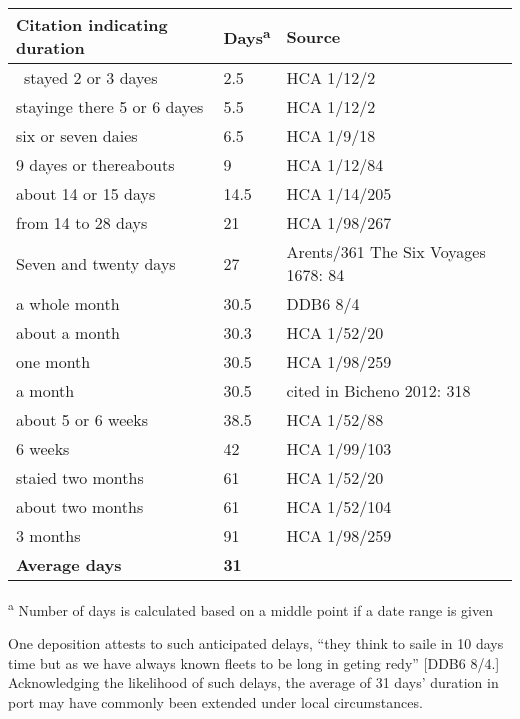 \begin{flushleft}
\tablefirsthead{}
\tablehead{}
\tabletail{}
\tablelasttail{}
\begin{supertabular}{m{2.2129598in}m{0.7747598in}m{2.7754598in}}
\hline
\textbf{Citation indicating duration} &
\textbf{Days}\textsuperscript{a} &
\textbf{Source}\\\hline
\ stayed 2 or 3 dayes  &
2.5 &
HCA 1/12/2\\
stayinge there 5 or 6 dayes &
5.5 &
HCA 1/12/2\\
six or seven daies &
6.5 &
HCA 1/9/18\\
9 dayes or thereabouts &
9 &
HCA 1/12/84\\
about 14 or 15 days &
14.5 &
HCA 1/14/205\\
from 14 to 28 days &
21 &
HCA 1/98/267\\
Seven and twenty days &
27 &
Arents/361 The Six Voyages 1678: 84\\
a whole month  &
30.5 &
DDB6 8/4\\
about a month &
30.3 &
HCA 1/52/20\\
one month &
30.5 &
HCA 1/98/259\\
a month &
30.5 &
cited in Bicheno 2012: 318\\
about 5 or 6 weeks &
38.5 &
HCA 1/52/88\\
6 weeks &
42 &
HCA 1/99/103\\
staied two months &
61 &
HCA 1/52/20\\
about two months &
61 &
HCA 1/52/104\\
3 months &
91 &
HCA 1/98/259\\\hline
\raggedleft \textbf{Average days} &
\textbf{31} &
\\\hline
\end{supertabular}
\end{flushleft}
\begin{styleStandard}
\textsuperscript{a}\textbf{\textsuperscript{ }}Number of days is calculated based on a middle point if a date range is given 
\end{styleStandard}

\begin{styleStandard}
One deposition attests to such anticipated delays, “they think to saile in 10 days time but as we have always known fleets to be long in geting redy” [DDB6 8/4.] Acknowledging the likelihood of such delays, the average of 31 days’ duration in port may have commonly been extended under local circumstances.
\end{styleStandard}

